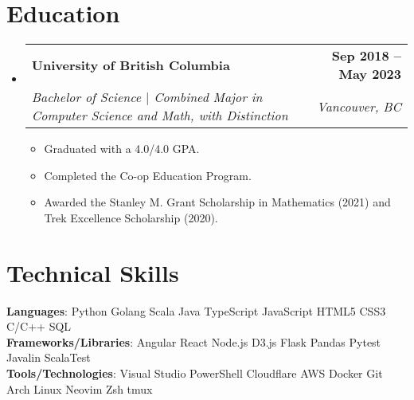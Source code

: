\documentclass[letterpaper,11pt]{article}
\makeatletter
\newcommand{\resumeItem}[1]{
  \item\small{
    {#1 \vspace{-2pt}}
  }
}
\newcommand{\resumeSubheading}[4]{
  \vspace{-2pt}\item
    \begin{tabular*}{1.0\textwidth}[t]{l@{\extracolsep{\fill}}r}
      \textbf{#1} & \textbf{\small #2} \\
      \textit{\small#3} & \textit{\small #4} \\
    \end{tabular*}\vspace{-7pt}
}
\newcommand{\resumeSubHeadingListStart}{\begin{itemize}[leftmargin=0.0in, label={}]}
\newcommand{\resumeSubHeadingListEnd}{\end{itemize}}
\newcommand{\resumeItemListStart}{\begin{itemize}}
\newcommand{\resumeItemListEnd}{\end{itemize}\vspace{-5pt}}
\makeatother
\begin{document}
\section{Education}
  \resumeSubHeadingListStart
    \resumeSubheading
      {University of British Columbia}{Sep 2018 -- May 2023}
      {Bachelor of Science $|$ Combined Major in Computer Science and Math, with Distinction}{Vancouver, BC}
      \resumeItemListStart
        \resumeItem{Graduated with a 4.0/4.0 GPA.}
        \resumeItem{Completed the Co-op Education Program.}
        \resumeItem{Awarded the Stanley M. Grant Scholarship in Mathematics (2021) and Trek Excellence Scholarship (2020).}
      \resumeItemListEnd
  \resumeSubHeadingListEnd
 \vspace{-16pt}

\section{Technical Skills}
 \begin{itemize}[leftmargin=0.15in, label={}]
    \small{\item{
     \textbf{Languages}{: Python \textperiodcentered{} Golang \textperiodcentered{} Scala \textperiodcentered{} Java \textperiodcentered{} TypeScript \textperiodcentered{} JavaScript \textperiodcentered{} HTML5 \textperiodcentered{} CSS3 \textperiodcentered{} C/C++ \textperiodcentered{} SQL} \\
     \textbf{Frameworks/Libraries}{: Angular \textperiodcentered{} React \textperiodcentered{} Node.js \textperiodcentered{} D3.js \textperiodcentered{} Flask \textperiodcentered{} Pandas \textperiodcentered{} Pytest \textperiodcentered{} Javalin \textperiodcentered{} ScalaTest} \\
     \textbf{Tools/Technologies}{: Visual Studio \textperiodcentered{} PowerShell \textperiodcentered{} Cloudflare \textperiodcentered{} AWS \textperiodcentered{} Docker \textperiodcentered{} Git \textperiodcentered{} Arch Linux \textperiodcentered{} Neovim \textperiodcentered{} Zsh \textperiodcentered{} tmux} \\
    }}
 \end{itemize}
\end{document}
